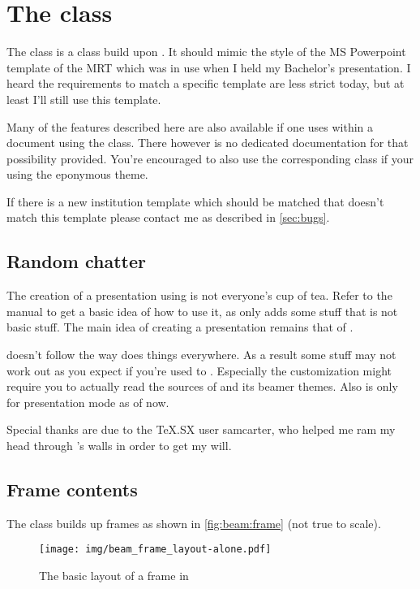 \chapter{The  class}
The  class is a class build upon . It should mimic the
style of the MS Powerpoint template of the MRT which was in use when I held my
Bachelor's presentation. I heard the requirements to match a specific
template are less strict today, but at least I'll still use this template.

Many of the features described here are also available if one uses
 within a document using the  class. There
however is no dedicated documentation for that possibility provided. You're
encouraged to also use the corresponding  class if your using the
eponymous theme.

If there is a new institution template which should be matched that doesn't
match this  template please contact me as described in
\autoref{sec:bugs}.

\section{Random chatter}
The creation of a presentation using  is not everyone's cup of tea.
Refer to the  manual to get a basic idea of how to use it, as
 only adds some stuff that is not basic  stuff. The
main idea of creating a presentation remains that of .

 doesn't follow the way  does things everywhere. As a
result some stuff may not work out as you expect if you're used to .
Especially the customization might require you to actually read the sources of
 and its beamer themes. Also  is only for presentation
mode as of now.

Special thanks are due to the TeX.SX user samcarter, who helped me ram my head
through 's walls in order to get my will.

\section{Frame contents}
The class builds up frames as shown in \autoref{fig:beam:frame} (not true to
scale).
\begin{figure}[!bp]
  \centering
  \texttt{[image: img/beam\_frame\_layout-alone.pdf]}
  \caption{The basic layout of a frame in }
  \label{fig:beam:frame}
\end{figure}

